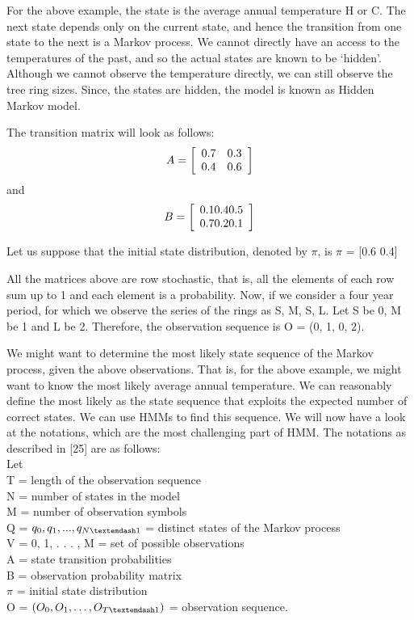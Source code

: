 For the above example, the state is the average annual temperature \textemdash H or C. The next state depends only on the current state, and hence the transition from one state to the next is a Markov process. We cannot directly have an access to the temperatures of the past, and so the actual states are known to be \lq hidden\rq. Although we cannot observe the temperature directly, we can still observe the tree ring sizes. Since, the states are hidden, the model is known as Hidden Markov model. 

The transition matrix will look as follows:
$$ A = \left[
  \begin{array}{c c}
     0.7& 0.3\\
     0.4& 0.6
  \end{array} \right]
$$
and 
$$ B = \left[
  \begin{array}{c c c}
     0.1 0.4 0.5\\
     0.7 0.2 0.1
  \end{array} \right]
$$

Let us suppose that the initial state distribution, denoted by $\pi$, is 
$\pi$ = [0.6 0.4]

All the matrices above are row stochastic, that is, all the elements of each row sum up to 1 and each element is a probability. Now, if we consider a four year period, for which we observe the series of the rings as S, M, S, L. Let S be 0, M be 1 and L be 2. Therefore, the observation sequence is 
O = (0, 1, 0, 2).

We might want to determine the most likely state sequence of the Markov process, given the above observations. That is, for the above example, we might want to know the most likely average annual temperature. We can reasonably define the most likely as the state sequence that exploits the expected number of correct states. We can use HMMs to find this sequence. We will now have a look at the notations, which are the most challenging part of HMM. The notations as described in [25] are as follows:\\
Let\\
T = length of the observation sequence\\
N = number of states in the model\\
M = number of observation symbols\\
Q = ${q_{0}, q_{1}, . . . , q_{N\textemdash1}}$ = distinct states of the Markov process\\
V = {0, 1, . . . , M} = set of possible observations\\
A = state transition probabilities\\
B = observation probability matrix\\
$\pi$ = initial state distribution\\
O = $(O_0, O_1,\dots, O_{T\textemdash1})$ = observation sequence.\\ 

